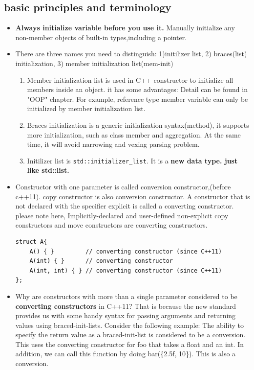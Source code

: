 \documentclass[a4paper,11pt,twoside]{book}
\begin{document}
\subsection{basic principles and terminology}
\begin{itemize}
	\item \textbf{Always initialize variable before you use it.} Manually initialize any non-member objects of built-in types,including a pointer.
	
	\item There are three names you need to distinguish: 1)initilizer list, 2) braces(list) initialization, 3) member initialization list(mem-init)

	\begin{enumerate}
		\item Member initialization list is used in C++ constructor to initialize all members inside an object. it has some advantages: Detail can be found in "OOP" chapter. For example, reference type member variable can only be initialized by member initialization list.
		
		\item Braces initialization is a generic initialization syntax(method), it supports more initialization, such as class member and aggregation. At the same time, it will avoid narrowing and vexing parsing problem. 
		
		\item Initilizer list is \texttt{std::initializer\_list}. It is a \textbf{new data type. just like std::list.}
	\end{enumerate}

	\item Constructor with one parameter is called conversion constructor,(before c++11).  copy constructor is also conversion constructor. A constructor that is not declared with the specifier explicit is called a converting constructor. please note here, Implicitly-declared and user-defined non-explicit copy constructors and move constructors are converting constructors.

\begin{lstlisting}[numbers=none]
struct A{
	A() { }         // converting constructor (since C++11)  
	A(int) { }      // converting constructor
	A(int, int) { } // converting constructor (since C++11)
};
\end{lstlisting}	

	\item Why are constructors with more than a single parameter considered to be \textbf{converting constructors} in C++11? That is because the new standard provides us with some handy syntax for passing arguments and returning values using braced-init-lists. Consider the following example: The ability to specify the return value as a braced-init-list is considered to be a conversion. This uses the converting constructor for foo that takes a float and an int. In addition, we can call this function by doing bar(\{2.5f, 10\}). This is also a conversion. 


\end{itemize}
\end{document}
